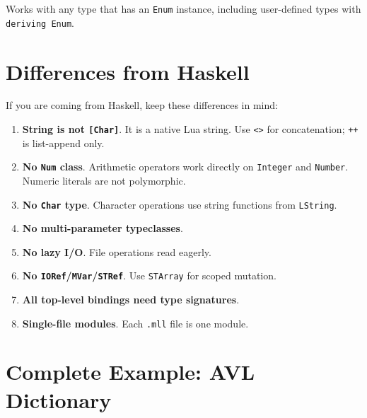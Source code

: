 \documentclass[11pt,a4paper]{article}
\begin{document}
Works with any type that has an \texttt{Enum} instance, including
user-defined types with \texttt{deriving Enum}.

\section{Differences from Haskell}

If you are coming from Haskell, keep these differences in mind:

\begin{enumerate}[nosep]
  \item \textbf{String is not \texttt{[Char]}}.  It is a native Lua string.
        Use \texttt{<>} for concatenation; \texttt{++} is list-append only.
  \item \textbf{No \texttt{Num} class}.  Arithmetic operators work directly
        on \texttt{Integer} and \texttt{Number}.  Numeric literals are not
        polymorphic.
  \item \textbf{No \texttt{Char} type}.  Character operations use string
        functions from \texttt{LString}.
  \item \textbf{No multi-parameter typeclasses}.
  \item \textbf{No lazy I/O}.  File operations read eagerly.
  \item \textbf{No \texttt{IORef}/\texttt{MVar}/\texttt{STRef}}.
        Use \texttt{STArray} for scoped mutation.
  \item \textbf{All top-level bindings need type signatures}.
  \item \textbf{Single-file modules}.  Each \texttt{.mll} file is one module.
\end{enumerate}

\section{Complete Example: AVL Dictionary}
\end{document}
